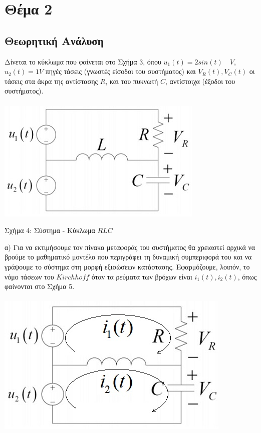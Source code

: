 \documentclass[12pt]{article}
\begin{document}
\section{Θέμα 2}
\subsection{Θεωρητική Ανάλυση}
Δίνεται το κύκλωμα που φαίνεται στο Σχήμα 3, όπου $u_{1}(t)=2sin(t) \quad V$, \\$ u_{2}(t)=1 V$ πηγές τάσεις (γνωστές είσοδοι του συστήματος) και $V_{R}(t),V_{C}(t)$ οι τάσεις στα άκρα της αντίστασης $R$, και του πυκνωτή $C$, αντίστοιχα (έξοδοι του συστήματος).
\\ \\
\includegraphics[width=\linewidth]{sys2.jpg}
\centerline{Σχήμα 4: Σύστημα - Κύκλωμα $RLC$}
\newline
\newline
α) Για να εκτιμήσουμε τον πίνακα μεταφοράς του συστήματος θα χρειαστεί αρχικά να βρούμε το μαθηματικό μοντέλο που περιγράφει τη δυναμική συμπεριφορά του και να γράψουμε το σύστημα στη μορφή εξισώσεων κατάστασης. Εφαρμόζουμε, λοιπόν, το νόμο τάσεων του $Kirchhoff$ όταν τα ρεύματα των βρόχων είναι $i_{1}(t),i_{2}(t)$, όπως φαίνονται στο Σχήμα 5.
\\ \\
\includegraphics[width=\linewidth]{sys2_2.jpg}
\end{document}
